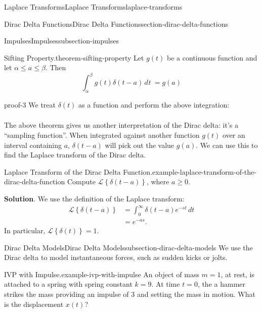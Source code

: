\documentclass[oneside,10pt,]{book}
\numberwithin{equation}{section}
\newcommand{\Int}[2]{\int_{#1}^{#2}}
\newcommand{\Laplace}[1]{\mathcal{L}\left\{#1\right\}}
\newcommand{\dd}[2][]{\, d^{#1} #2\ }
\newcommand{\amp}{&}
\begin{document}
\begin{chapterptx}{Laplace Transforms}{}{Laplace Transforms}{}{}{laplace-transforms}
\begin{sectionptx}{Dirac Delta Functions}{}{Dirac Delta Functions}{}{}{section-dirac-delta-functions}
\begin{subsectionptx}{Impulses}{}{Impulses}{}{}{subsection-impulses}
\begin{theorem}{Sifting Property.}{}{theorem-sifting-property}%
\hypertarget{p-540}{}%
Let \(g(t)\) be a continuous function and let \(\alpha\leq a\leq\beta\). Then%
\begin{equation*}
\Int{\alpha}{\beta}g(t)\delta(t-a)\dd{t} = g(a)
\end{equation*}
%
\end{theorem}
\begin{proofptx}{}{proof-3}
\hypertarget{p-541}{}%
We treat \(\delta(t)\) as a function and perform the above integration:%
\begin{align*}
\end{align*}
%
\end{proofptx}
\hypertarget{p-542}{}%
The above theorem gives us another interpretation of the Dirac delta: it's a ``sampling function''. When integrated against another function \(g(t)\) over an interval containing \(a\), \(\delta(t-a)\) will pick out the value \(g(a)\). We can use this to find the Laplace transform of the Dirac delta.%
\begin{example}{Laplace Transform of the Dirac Delta Function.}{example-laplace-transform-of-the-dirac-delta-function}%
\hypertarget{p-543}{}%
Compute \(\Laplace{\delta(t-a)}\), where \(a\geq0\).%
\par\smallskip%
\noindent\textbf{Solution}.\hypertarget{solution-86}{}\quad%
\hypertarget{p-544}{}%
We use the definition of the Laplace transform:%
\begin{align*}
\Laplace{\delta(t-a)} \amp= \int_{0}^{\infty}\delta(t-a)e^{-st}\,dt\\
\amp= e^{-as}\text{.}
\end{align*}
In particular, \(\Laplace{\delta(t)} = 1\).%
\end{example}
\end{subsectionptx}
%
%
\typeout{************************************************}
\typeout{************************************************}
%
\begin{subsectionptx}{Dirac Delta Models}{}{Dirac Delta Models}{}{}{subsection-dirac-delta-models}
\hypertarget{p-545}{}%
We use the Dirac delta to model instantaneous forces, such as sudden kicks or jolts.%
\begin{example}{IVP with Impulse.}{example-ivp-with-impulse}%
\hypertarget{p-546}{}%
An object of mass \(m=1\), at rest, is attached to a spring with spring constant \(k=9\). At time \(t=0\), the a hammer strikes the mass providing an impulse of \(3\) and setting the mass in motion. What is the displacement \(x(t)\)?%

\end{example}
\end{subsectionptx}
\end{sectionptx}
\end{chapterptx}
\end{document}

